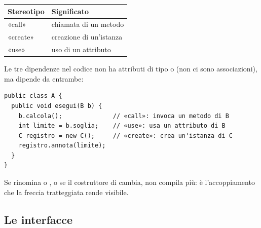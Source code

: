 \begin{table}[H]
\centering
\renewcommand{\arraystretch}{1.3}
\begin{tabular}{>{\ttfamily}l l}
\toprule
\normalfont\textbf{Stereotipo} & \textbf{Significato} \\
\midrule
«call» & chiamata di un metodo \\
«create» & creazione di un'istanza \\
«use» & uso di un attributo \\
\bottomrule
\end{tabular}
\end{table}

\begin{esempio}{Le tre dipendenze nel codice}
 non ha attributi di tipo  o  (non ci sono associazioni), ma dipende da entrambe:
\begin{lstlisting}[style=java, name=A.java]
public class A {
  public void esegui(B b) {
    b.calcola();              // «call»: invoca un metodo di B
    int limite = b.soglia;    // «use»: usa un attributo di B
    C registro = new C();     // «create»: crea un'istanza di C
    registro.annota(limite);
  }
}
\end{lstlisting}
Se  rinomina  o , o se il costruttore di  cambia,  non compila più: è
l'accoppiamento che la freccia tratteggiata rende visibile.
\end{esempio}

\subsection{Le interfacce}


